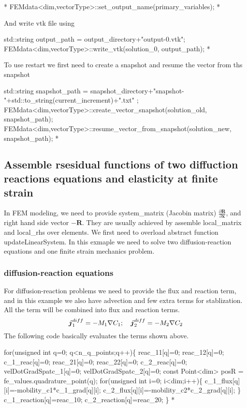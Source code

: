 \begin{DoxyCode}
 *  FEMdata<dim,vectorType>::set_output_name(primary\_variables);
* 
\end{DoxyCode}
 And write vtk file using 
\begin{DoxyCode}
  std::string output\_path = output\_directory+\textcolor{stringliteral}{"output-0.vtk"};
  FEMdata<dim,vectorType>::write_vtk(solution\_0, output\_path);
* 
\end{DoxyCode}
 To use restart we first need to create a snapshot and resume the vector from ths snapshot 
\begin{DoxyCode}
        std::string snapshot\_path = snapshot\_directory+\textcolor{stringliteral}{"snapshot-"}+std::to\_string(current\_increment)+\textcolor{stringliteral}{".txt"}
      ;
        FEMdata<dim,vectorType>::create_vector_snapshot(solution\_old, snapshot\_path);
        FEMdata<dim,vectorType>::resume_vector_from_snapshot(solution\_new, snapshot\_path);
* 
\end{DoxyCode}
 \hypertarget{_intercalation_assemble}{}\subsection{Assemble rsesidual functions of two diffuction reactions equations and elasticity at finite strain}\label{_intercalation_assemble}
In F\-E\-M modeling, we need to provide system\-\_\-matrix (Jacobin matrix) $\frac{\partial \boldsymbol{R}}{\partial \boldsymbol{x}} $, and right hand side vector $-\boldsymbol{R}$. They are usually achieved by assemble {\ttfamily local\-\_\-matrix} and {\ttfamily local\-\_\-rhs} over elements. We first need to overload abstract function {\ttfamily update\-Linear\-System}. In this exmaple we need to solve two diffusion-\/reaction equations and one finite strain mechanics problem. \hypertarget{_intercalation_DRq}{}\subsubsection{diffusion-\/reaction equations}\label{_intercalation_DRq}
For diffusion-\/reaction problems we need to provide the flux and reaction term, and in this example we also have advection and few extra terms for stablization. All the term will be combined into {\ttfamily flux} and {\ttfamily reaction} terms. \[ \boldsymbol{j}_1^{diff}=-M_1\nabla C_\text{1}; \quad \boldsymbol{j}_2^{diff}=-M_2\nabla C_\text{2}\\ \] The following code basically evaluates the terms shown above. 
\begin{DoxyCode}
\textcolor{keywordflow}{for}(\textcolor{keywordtype}{unsigned} \textcolor{keywordtype}{int} q=0; q<n\_q\_points;q++)\{
    reac\_11[q]=0; reac\_12[q]=0; c\_1\_reac[q]=0; 
    reac\_21[q]=0; reac\_22[q]=0; c\_2\_reac[q]=0; 
    velDotGradSpatc\_1[q]=0;
    velDotGradSpatc\_2[q]=0;
    \textcolor{keyword}{const} Point<dim> posR = fe\_values.quadrature\_point(q);
    \textcolor{keywordflow}{for}(\textcolor{keywordtype}{unsigned} \textcolor{keywordtype}{int} i=0; i<dim;i++)\{
        c\_1\_flux[q][i]=-mobility\_c1*c\_1\_grad[q][i];
        c\_2\_flux[q][i]=-mobility\_c2*c\_2\_grad[q][i];
    \}       
    c\_1\_reaction[q]=reac\_10;
    c\_2\_reaction[q]=reac\_20;
\}
*
\end{DoxyCode}
